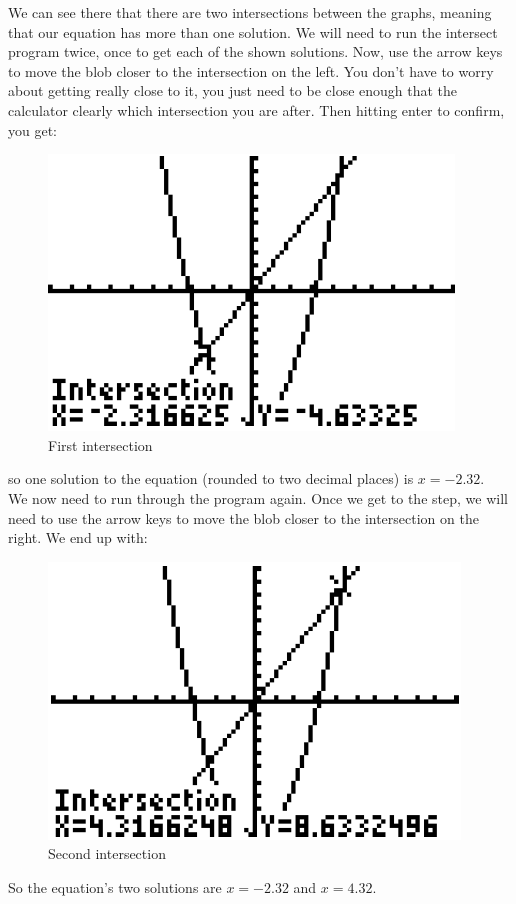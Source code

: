 {	We can see there that there are two intersections between the graphs, meaning that our equation has more than one solution. We will need to run the intersect program twice, once to get each of the shown solutions.  Now, use the arrow keys to move the blob closer to the intersection on the left. You don’t have to worry about getting really close to it, you just need to be close enough that the calculator clearly  which intersection you are after. Then hitting enter to
	confirm, you get:
	
	\begin{figure}[H]
		\centering
		\includegraphics[scale=1.0]{Sections/SolvingEquationsGraphically/Figure14.png}
		\caption{First intersection}
	\end{figure}
	
	so one solution to the equation (rounded to two decimal places) is $x=-2.32$.\\
	
	We now need to run through the program again. Once we get to the  step, we will need to use the arrow keys to move the blob closer to the intersection on the right. We end up with:
	
	\begin{figure}[H]
		\centering
		\includegraphics[scale=1.0]{Sections/SolvingEquationsGraphically/Figure15.png}
		\caption{Second intersection}
	\end{figure}
	
	So the equation’s two solutions are $x=-2.32$ and $x=4.32$.
}

